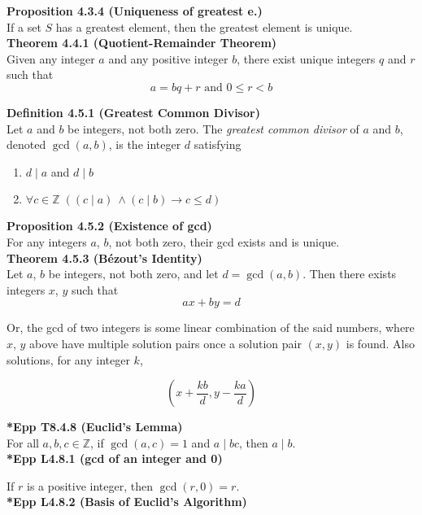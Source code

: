 \documentclass[a4paper]{article}
\newcommand{\subheading}[1]{{\scriptsize\textbf{#1}}}
\begin{document}
\begin{multicols*}{4}
\subheading{Proposition 4.3.4 (Uniqueness of greatest e.)}\\
If a set $S$ has a greatest element, then the greatest element is unique.\\

\subheading{Theorem 4.4.1 (Quotient-Remainder Theorem)}\\
Given any integer $a$ and any positive integer $b$, there exist unique integers
$q$ and $r$ such that $$ a = bq + r \text{ and } 0 \leq r < b$$

\subheading{Definition 4.5.1 (Greatest Common Divisor)}\\
Let $a$ and $b$ be integers, not both zero. The \textit{greatest common divisor}
of $a$ and $b$, denoted $\gcd(a, b)$, is the integer $d$ satisfying

\begin{enumerate} \itemsep -0.5em
  \item $d\;|\;a$ and $d\;|\;b$
  \item $\forall c \in \mathbb{Z}\;((c\;|\;a)\ \land (c\;|\;b) \rightarrow c \leq d)$
\end{enumerate}

\subheading{Proposition 4.5.2 (Existence of gcd)}\\
For any integers $a$, $b$, not both zero, their gcd exists and is unique.\\

\subheading{Theorem 4.5.3 (B\'ezout's Identity)}\\
Let $a$, $b$ be integers, not both zero, and let $d = \gcd(a, b)$. Then
there exists integers $x$, $y$ such that $$ax + by = d$$

Or, the gcd of two integers is some linear combination of the said numbers,
where $x$, $y$ above have multiple solution pairs once a solution pair $(x, y)$
is found. Also solutions, for any integer $k$,

$$ (x+\frac{kb}{d}, y-\frac{ka}{d}) $$

\subheading{*Epp T8.4.8 (Euclid's Lemma)}\\
For all $a, b, c \in \mathbb{Z}$, if $\gcd(a, c) = 1$ and $a\;|\;bc$,
then $a\;|\;b$.\\

\subheading{*Epp L4.8.1 (gcd of an integer and 0)}

If $r$ is a positive integer, then $\gcd(r, 0) = r$.\\

\subheading{*Epp L4.8.2 (Basis of Euclid's Algorithm)}


\end{multicols*}
\end{document}
